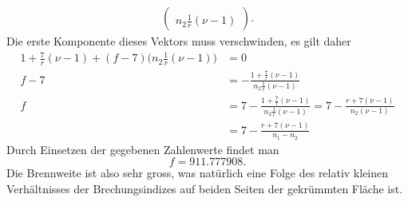\begin{loesung}
\begin{align*}
\begin{pmatrix}
\\
n_2\frac1r(\nu-1)
\end{pmatrix}.
\end{align*}
Die erste Komponente dieses Vektors muss verschwinden, es gilt daher
\begin{align*}
1+\frac7r(\nu-1)
+
(f-7)\biggl(n_2\frac1r(\nu-1)\biggr)
&=
0
\\
f-7
&=
-\frac{1+\frac7r(\nu-1)}{ n_2\frac1r(\nu-1) }
\\
f
&=
7
-\frac{1+\frac7r(\nu-1)}{ n_2\frac1r(\nu-1) }
=
7
-\frac{r+7(\nu-1)}{ n_2(\nu-1) }
\\
&=
7
-\frac{r+7(\nu-1)}{ n_1 -n_2 }
\end{align*}
Durch Einsetzen der gegebenen Zahlenwerte findet man
\[
f=911.777908.
\]
Die Brennweite ist also sehr gross, was natürlich eine Folge des
relativ kleinen Verhältnisses der Brechungsindizes auf beiden
Seiten der gekrümmten Fläche ist.
\end{loesung}


